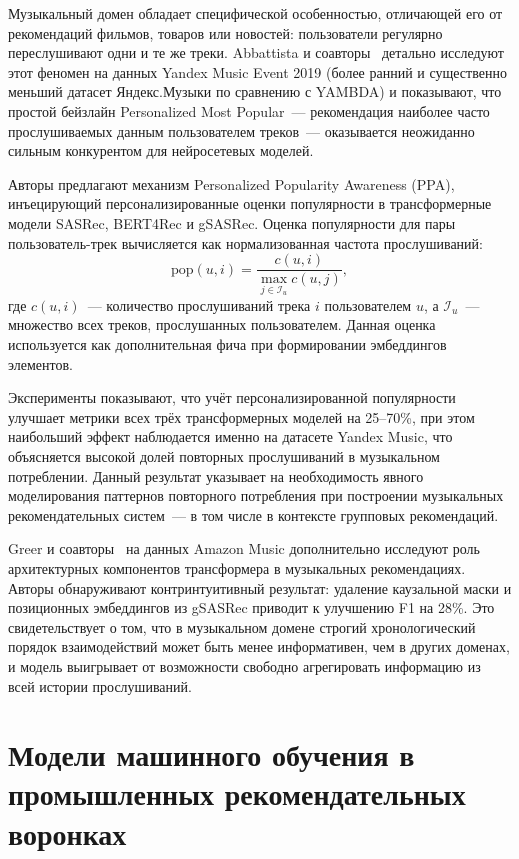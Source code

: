 Музыкальный домен обладает специфической особенностью, отличающей его от рекомендаций фильмов, товаров или новостей: пользователи регулярно переслушивают одни и те же треки. Abbattista и соавторы~\cite{abbattista2024sequential} детально исследуют этот феномен на данных Yandex Music Event 2019 (более ранний и существенно меньший датасет Яндекс.Музыки по сравнению с YAMBDA) и показывают, что простой бейзлайн Personalized Most Popular~--- рекомендация наиболее часто прослушиваемых данным пользователем треков~--- оказывается неожиданно сильным конкурентом для нейросетевых моделей.

Авторы предлагают механизм Personalized Popularity Awareness (PPA), инъецирующий персонализированные оценки популярности в трансформерные модели SASRec, BERT4Rec и gSASRec. Оценка популярности для пары пользователь-трек вычисляется как нормализованная частота прослушиваний:
\begin{equation}
    \mathrm{pop}(u, i) = \frac{c(u, i)}{\max_{j \in \mathcal{I}_u} c(u, j)},
\end{equation}
где $c(u, i)$~--- количество прослушиваний трека $i$ пользователем $u$, а $\mathcal{I}_u$~--- множество всех треков, прослушанных пользователем. Данная оценка используется как дополнительная фича при формировании эмбеддингов элементов.

Эксперименты показывают, что учёт персонализированной популярности улучшает метрики всех трёх трансформерных моделей на 25--70\%, при этом наибольший эффект наблюдается именно на датасете Yandex Music, что объясняется высокой долей повторных прослушиваний в музыкальном потреблении. Данный результат указывает на необходимость явного моделирования паттернов повторного потребления при построении музыкальных рекомендательных систем~--- в том числе в контексте групповых рекомендаций.

Greer и соавторы~\cite{greer2025beyond} на данных Amazon Music дополнительно исследуют роль архитектурных компонентов трансформера в музыкальных рекомендациях. Авторы обнаруживают контринтуитивный результат: удаление каузальной маски и позиционных эмбеддингов из gSASRec приводит к улучшению F1 на 28\%. Это свидетельствует о том, что в музыкальном домене строгий хронологический порядок взаимодействий может быть менее информативен, чем в других доменах, и модель выигрывает от возможности свободно агрегировать информацию из всей истории прослушиваний.

\section{Модели машинного обучения в промышленных рекомендательных воронках}

